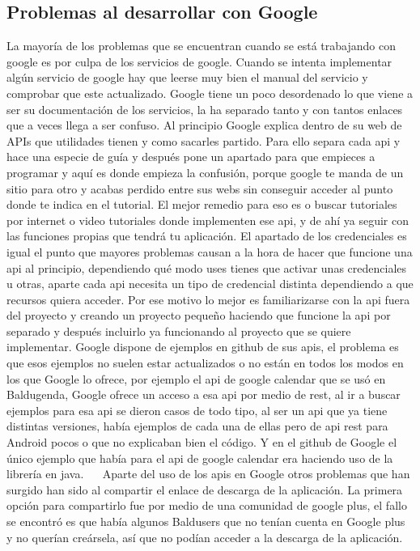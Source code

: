 \subsection{Problemas al desarrollar con Google}
\label{subsecc:Problemas al desarrollar con Google}

La mayoría de los problemas que se encuentran cuando se está trabajando con google es por culpa de los servicios de google.
Cuando se intenta implementar algún servicio de google hay que leerse muy bien el manual del servicio y comprobar que este actualizado. Google tiene un poco desordenado lo que viene a ser su documentación de los servicios, la ha separado tanto y con tantos enlaces que a veces llega a ser confuso.
Al principio Google explica dentro de su web de APIs que utilidades tienen y como sacarles partido. Para ello separa cada api y hace una especie de guía y después pone un apartado para que empieces a programar y aquí es donde empieza la confusión, porque google te manda de un sitio para otro y acabas perdido entre sus webs sin conseguir acceder al punto donde te indica en el tutorial.
El mejor remedio para eso es o buscar tutoriales por internet o video tutoriales donde implementen ese api, y de ahí ya seguir con las funciones propias que tendrá tu aplicación.
 El apartado de los credenciales es igual el punto que mayores problemas causan a la hora de hacer que funcione una api al principio, dependiendo qué modo uses tienes que activar unas credenciales u otras, aparte cada api necesita un tipo de credencial distinta dependiendo a que recursos quiera acceder.
Por ese motivo lo mejor es familiarizarse con la api fuera del proyecto y creando un proyecto pequeño haciendo que funcione la api por separado y después incluirlo ya funcionando al proyecto que se quiere implementar.
Google dispone de ejemplos en github de sus apis, el problema es que esos ejemplos no suelen estar actualizados o no están en todos los modos en los que Google lo ofrece, por ejemplo el api de google calendar que se usó en Baldugenda, Google ofrece un acceso a esa api por medio de rest, al ir a buscar ejemplos para esa api se dieron casos de todo tipo, al ser un api que ya tiene distintas versiones, había ejemplos de cada una de ellas pero  de api rest para Android pocos o que no explicaban bien el código. Y en el github de Google el único ejemplo que había para el api de google calendar era haciendo uso de la librería en java.
 
Aparte del uso de los apis en Google otros problemas que han surgido han sido al compartir el enlace de descarga de la aplicación.
La primera opción para compartirlo fue por medio de una comunidad de google plus,  el fallo se encontró es que había algunos Baldusers que no tenían cuenta en Google plus y no querían creársela, así que no podían acceder a la descarga de la aplicación.
